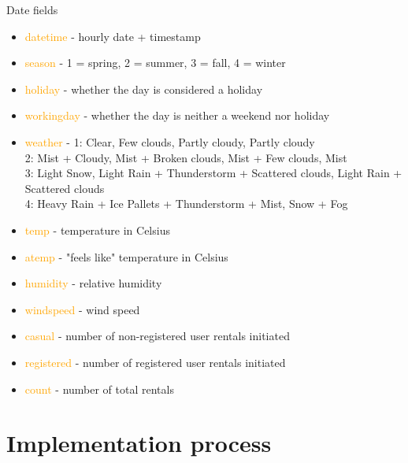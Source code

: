 \documentclass[
size=14pt,
paper=smartboard,  %
mode=present, 		%
display=slides, 	%
style=tuliplab,  	%
pauseslide,
fleqn,leqno]{powerdot}
\begin{document}
	\begin{slide}{Date fields}
		
		\begin{itemize}
			\item \textcolor{orange}{datetime} - hourly date + timestamp
			\item \textcolor{orange}{season} - 1 = spring, 2 = summer, 3 = fall, 4 = winter 
			\item \textcolor{orange}{holiday} - whether the day is considered a holiday
			\item \textcolor{orange}{workingday}  - whether the day is neither a weekend nor holiday
			\item \textcolor{orange}{weather} - 1: Clear, Few clouds, Partly cloudy, Partly cloudy
			\\2: Mist + Cloudy, Mist + Broken clouds, Mist + Few clouds, Mist
			\\3: Light Snow, Light Rain + Thunderstorm + Scattered clouds, Light Rain + Scattered clouds
			\\4: Heavy Rain + Ice Pallets + Thunderstorm + Mist, Snow + Fog
			\item \textcolor{orange}{temp} - temperature in Celsius
			\item \textcolor{orange}{atemp} - "feels like" temperature in Celsius
			\item \textcolor{orange}{humidity} - relative humidity
			\item \textcolor{orange}{windspeed} - wind speed
			\item \textcolor{orange}{casual} - number of non-registered user rentals initiated
			\item \textcolor{orange}{registered} - number of registered user rentals initiated
			\item \textcolor{orange}{count} - number of total rentals
		\end{itemize}
		
	\end{slide}
	
	\section{Implementation process}
	
\end{document}

